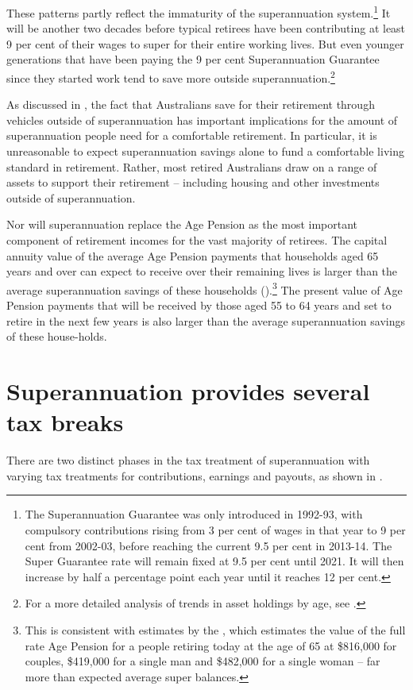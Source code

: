 These patterns partly reflect the immaturity of the superannuation system.\footnote{%
The Superannuation Guarantee was only introduced in 1992-93, with compulsory contributions rising from 3 per cent of wages in that year to 9 per cent from 2002-03, before reaching the current 9.5 per cent in 2013-14. The Super Guarantee rate will remain fixed at 9.5 per cent until 2021. It will then increase by half a percentage point each year until it reaches 12 per cent. 
} It will be another two decades before typical retirees have been contributing at least 9 per cent of their wages to super for their entire working lives. But even younger generations that have been paying the 9 per cent Superannuation Guarantee since they started work tend to save more outside superannuation.\footnote{For a more detailed analysis of trends in asset holdings by age, see \textcite[][14]{DaleyWoodWeidmannEtAl2014}.}  


As discussed in , the fact that Australians save for their retirement through vehicles outside of superannuation has important implications for the amount of superannuation people need for a comfortable retirement. In particular, it is unreasonable to expect superannuation savings alone to fund a comfortable living standard in retirement. Rather, most retired Australians draw on a range of assets to support their retirement – including housing and other investments outside of superannuation. 

Nor will superannuation replace the Age Pension as the most important component of retirement incomes for the vast majority of retirees. The capital annuity value of the average Age Pension payments that households aged 65 years and over can expect to receive over their remaining lives is larger than the average superannuation savings of these households ().\footnote{This is consistent with estimates by the \textcite[][7]{ActuariesInstitute2015RetirementIncomes}, which estimates the value of the full rate Age Pension for a people retiring today at the age of 65 at \$816,000 for couples, \$419,000 for a single man and \$482,000 for a single woman – far more than expected average super balances.} The present value of Age Pension payments that will be received by those aged 55 to 64 years and set to retire in the next few years is also larger than the average superannuation savings of these house-holds. 


\section{Superannuation provides several tax breaks}
There are two distinct phases in the tax treatment of superannuation with varying tax treatments for contributions, earnings and payouts, as shown in .

